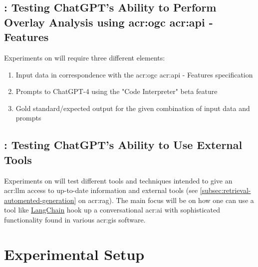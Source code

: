 \subsection[RQ2: Testing ChatGPT's Ability to Perform Overlay Analysis using OGC API - Features]{: Testing ChatGPT's Ability to Perform Overlay Analysis using \acrshort{acr:ogc} \acrshort{acr:api} - Features}

Experiments on  will require three different elements:

\begin{enumerate}
    \item Input data in correspondence with the \acrshort{acr:ogc} \acrshort{acr:api} - Features specification
    \item Prompts to ChatGPT-4 using the "Code Interpreter" beta feature
    \item Gold standard/expected output for the given combination of input data and prompts
\end{enumerate}

\subsection[RQ3: Testing ChatGPT's Ability to To Use External Tools]{: Testing ChatGPT's Ability to Use External Tools}

Experiments on  will test different tools and techniques intended to give an \acrshort{acr:llm} access to up-to-date information and external tools (see \autoref{subsec:retrieval-automented-generation} on \acrlong{acr:rag}). The main focus will be on how one can use a tool like \hyperref[subsubsec:langchain]{LangChain} hook up a conversational \acrshort{acr:ai} with sophisticated functionality found in various \acrshort{acr:gis} software.

\section{Experimental Setup}
\label{sec:experimentalSetup}

\begin{comment}
The experimental setup should include all data --- parameters, etc. --- that would allow a person to repeat your experiments.
This will thus be the actual instantiation for each experiment of the general architecture described in Chapter~\ref{cha:architecture}.
\end{comment}

